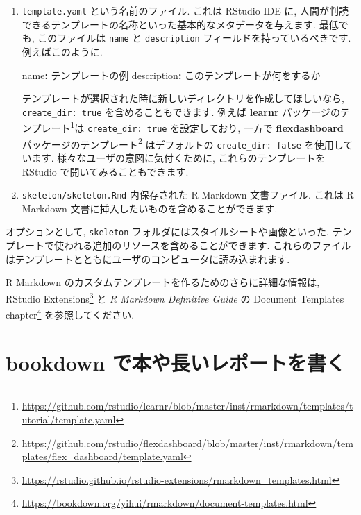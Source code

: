 \documentclass[
  11pt,
]{bxjsreport}
\newenvironment{Shaded}{\begin{snugshade}}{\end{snugshade}}
\newcommand{\AttributeTok}[1]{\textcolor[rgb]{0.77,0.63,0.00}{#1}}
\newcommand{\FunctionTok}[1]{\textcolor[rgb]{0.00,0.00,0.00}{#1}}
\newcommand{\KeywordTok}[1]{\textcolor[rgb]{0.13,0.29,0.53}{\textbf{#1}}}
\renewcommand{\href}[2]{#2\footnote{\url{#1}}}
\begin{document}
\begin{enumerate}
\def\labelenumi{\arabic{enumi}.}
\item
  \texttt{template.yaml} という名前のファイル. これは RStudio IDE に, 人間が判読できるテンプレートの名称といった基本的なメタデータを与えます. 最低でも, このファイルは \texttt{name} と \texttt{description} フィールドを持っているべきです. 例えばこのように.

\begin{Shaded}
\begin{Highlighting}[]
\FunctionTok{name}\KeywordTok{:}\AttributeTok{ テンプレートの例}
\FunctionTok{description}\KeywordTok{:}\AttributeTok{ このテンプレートが何をするか}
\end{Highlighting}
\end{Shaded}

  テンプレートが選択された時に新しいディレクトリを作成してほしいなら, \texttt{create\_dir: true} を含めることもできます. 例えば \href{https://github.com/rstudio/learnr/blob/master/inst/rmarkdown/templates/tutorial/template.yaml}{\textbf{learnr} パッケージのテンプレート}は \texttt{create\_dir: true} を設定しており, 一方で \href{https://github.com/rstudio/flexdashboard/blob/master/inst/rmarkdown/templates/flex_dashboard/template.yaml}{\textbf{flexdashboard} パッケージのテンプレート} はデフォルトの \texttt{create\_dir: false} を使用しています. 様々なユーザの意図に気付くために, これらのテンプレートを RStudio で開いてみることもできます.
\item
  \texttt{skeleton/skeleton.Rmd} 内保存された R Markdown 文書ファイル. これは R Markdown 文書に挿入したいものを含めることができます.
\end{enumerate}

オプションとして, \texttt{skeleton} フォルダにはスタイルシートや画像といった, テンプレートで使われる追加のリソースを含めることができます. これらのファイルはテンプレートとともにユーザのコンピュータに読み込まれます.

R Markdown のカスタムテンプレートを作るためのさらに詳細な情報は, \href{https://rstudio.github.io/rstudio-extensions/rmarkdown_templates.html}{RStudio Extensions} と \emph{R Markdown Definitive Guide} \autocite{rmarkdown2018} の \href{https://bookdown.org/yihui/rmarkdown/document-templates.html}{Document Templates chapter} を参照してください.

\hypertarget{bookdown}{%
\section{\texorpdfstring{\textbf{bookdown} で本や長いレポートを書く}{bookdown で本や長いレポートを書く}}\label{bookdown}}
\end{document}
